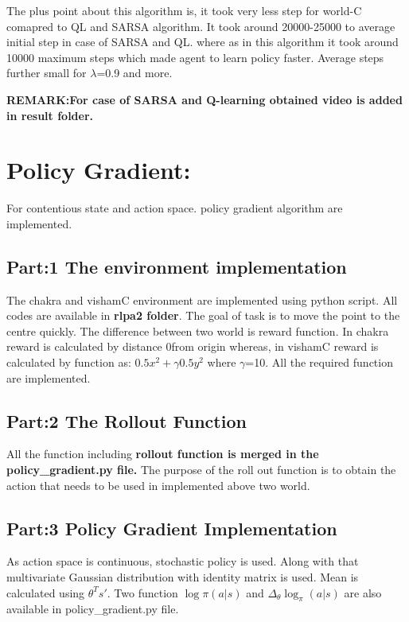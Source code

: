 \documentclass[preprint,12pt]{elsarticle}
\begin{document}
The plus point about this algorithm is, it took very less step for world-C comapred to QL and SARSA algorithm. It took around 20000-25000 to average initial step in case of SARSA and QL. where as in this algorithm it took around 10000 maximum steps which made agent to learn policy faster. Average steps further small for $\lambda$=0.9 and more.  

\textbf{REMARK:For case of SARSA and Q-learning obtained video is added in result folder.}


\section{Policy Gradient:}
 For contentious state and action space. policy gradient algorithm are implemented. \cite{david}
 \subsection{Part:1 The environment implementation}
 The  chakra and vishamC environment are implemented using python script. All codes are available in \textbf{rlpa2 folder}.
 The goal of task is to move the point to the centre quickly. The difference between two world is reward function. In chakra reward is calculated by distance 0from origin whereas, in vishamC reward is calculated by function as: $0.5x^2 + \gamma 0.5 y^2$ where $\gamma$=10.
 All the required function are implemented.
 
 \vspace{2mm}
 \subsection{Part:2 The Rollout Function}
  All the function including \textbf{rollout function is merged in the policy\_gradient.py file.} The purpose of the roll out function is to obtain the action that needs to be used in implemented above two world.
  
   \vspace{2mm}
 \subsection{Part:3 Policy Gradient Implementation}
	As action space is continuous, stochastic  policy is used. Along with that multivariate Gaussian distribution with identity matrix is used. Mean is calculated using $\theta^T s'$. Two function $ \log \pi (a|s)$ and $\Delta_\theta \log_\pi (a|s)$ are also available in policy\_gradient.py file.
	
\end{document}
